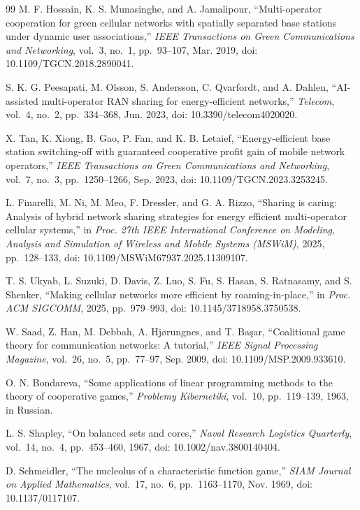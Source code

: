 \documentclass{article}
\theoremstyle{definition}
\theoremstyle{remark}
\theoremstyle{remark}
\theoremstyle{plain}
\theoremstyle{definition}
\theoremstyle{definition}
\theoremstyle{definition}
\begin{document}
\begin{thebibliography}{99}
M. F. Hossain, K. S. Munasinghe, and A. Jamalipour,
``Multi-operator cooperation for green cellular networks with spatially
separated base stations under dynamic user associations,''
\textit{IEEE Transactions on Green Communications and Networking}, vol.~3,
no.~1, pp.~93--107, Mar. 2019, doi: 10.1109/TGCN.2018.2890041.

S. K. G. Peesapati, M. Olsson, S. Andersson, C. Qvarfordt, and A. Dahlen,
``AI-assisted multi-operator RAN sharing for energy-efficient networks,''
\textit{Telecom}, vol.~4, no.~2, pp.~334--368, Jun. 2023,
doi: 10.3390/telecom4020020.

X. Tan, K. Xiong, B. Gao, P. Fan, and K. B. Letaief,
``Energy-efficient base station switching-off with guaranteed cooperative
profit gain of mobile network operators,'' \textit{IEEE Transactions on Green
Communications and Networking}, vol.~7, no.~3, pp.~1250--1266, Sep. 2023,
doi: 10.1109/TGCN.2023.3253245.

L. Finarelli, M. Ni, M. Meo, F. Dressler, and G. A. Rizzo,
``Sharing is caring: Analysis of hybrid network sharing strategies for energy
efficient multi-operator cellular systems,'' in \textit{Proc. 27th IEEE
International Conference on Modeling, Analysis and Simulation of Wireless and
Mobile Systems (MSWiM)}, 2025, pp.~128--133,
doi: 10.1109/MSWiM67937.2025.11309107.

T. S. Ukyab, L. Suzuki, D. Davis, Z. Luo, S. Fu, S. Hasan, S. Ratnasamy,
and S. Shenker,
``Making cellular networks more efficient by roaming-in-place,'' in
\textit{Proc. ACM SIGCOMM}, 2025, pp.~979--993,
doi: 10.1145/3718958.3750538.

W. Saad, Z. Han, M. Debbah, A. Hj{\o}rungnes, and T. Ba\c{s}ar,
``Coalitional game theory for communication networks: A tutorial,''
\textit{IEEE Signal Processing Magazine}, vol.~26, no.~5, pp.~77--97,
Sep. 2009, doi: 10.1109/MSP.2009.933610.

O. N. Bondareva,
``Some applications of linear programming methods to the theory of
cooperative games,'' \textit{Problemy Kibernetiki}, vol.~10,
pp.~119--139, 1963, in Russian.

L. S. Shapley, ``On balanced sets and cores,''
\textit{Naval Research Logistics Quarterly}, vol.~14, no.~4,
pp.~453--460, 1967, doi: 10.1002/nav.3800140404.

D. Schmeidler, ``The nucleolus of a characteristic function game,''
\textit{SIAM Journal on Applied Mathematics}, vol.~17, no.~6,
pp.~1163--1170, Nov. 1969, doi: 10.1137/0117107.


\end{thebibliography}
\end{document}
